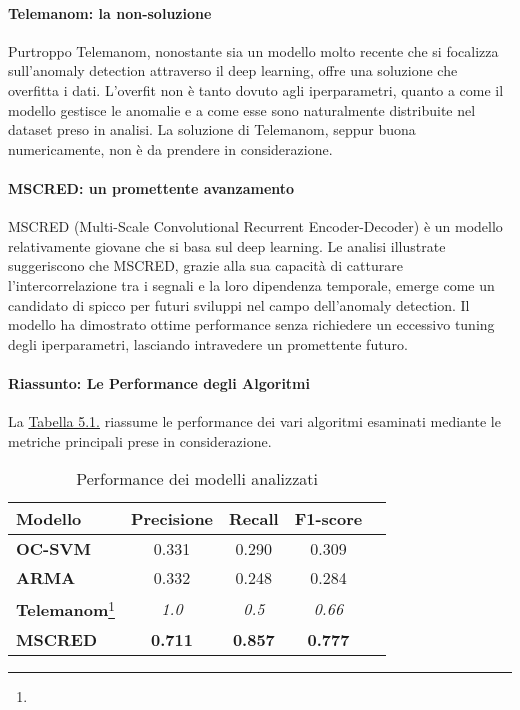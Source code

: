         \paragraph{Telemanom: la non-soluzione} Purtroppo Telemanom\cite{telemanom}, nonostante sia un modello molto recente 
        che si focalizza sull'anomaly detection attraverso il deep learning, offre una soluzione che overfitta i dati. 
        L'overfit non è tanto dovuto agli iperparametri, quanto a come il modello gestisce le anomalie e a come 
        esse sono naturalmente distribuite nel dataset preso in analisi. La soluzione di Telemanom, seppur buona numericamente, 
        non è da prendere in considerazione.

        \paragraph{MSCRED: un promettente avanzamento} MSCRED\cite{mscred} (Multi-Scale Convolutional Recurrent Encoder-Decoder) 
        è un modello relativamente giovane che si basa sul deep learning. Le analisi illustrate suggeriscono che MSCRED, grazie 
        alla sua capacità di catturare l'intercorrelazione tra i segnali e la loro dipendenza temporale, emerge come un 
        candidato di spicco per futuri sviluppi nel campo dell'anomaly detection. Il modello ha dimostrato ottime 
        performance senza richiedere un eccessivo tuning degli iperparametri, lasciando intravedere un promettente futuro.

        \paragraph{Riassunto: Le Performance degli Algoritmi} La \hyperref[tab:recap-perf]{Tabella 5.1.} riassume 
        le performance dei vari algoritmi esaminati mediante le metriche principali prese in considerazione.


    \begin{table}[H]
        \centering
        \caption{Performance dei modelli analizzati}
        \begin{tabular}{lcccc}
        \toprule
        \textbf{Modello} & \textbf{Precisione} & \textbf{Recall} & \textbf{F1-score} \\
        \midrule
        \textbf{OC-SVM} & 0.331 & 0.290 & 0.309 \\
        \textbf{ARMA} & 0.332 & 0.248 & 0.284 \\
        \textbf{Telemanom}\footnote{}  & \emph{1.0} & \emph{0.5} & \emph{0.66} \\
        \textbf{MSCRED} & \textbf{0.711} & \textbf{0.857} & \textbf{0.777} \\
        \bottomrule
        \end{tabular}
        \label{tab:recap-perf}
    \end{table}
    
